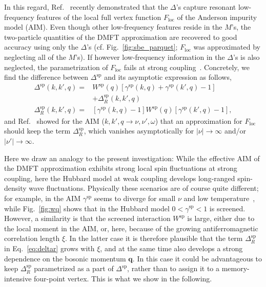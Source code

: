 \documentclass[epj]{svjour}
\newcommand{\qv}{\ensuremath{\mathbf{q}}}
\newcommand{\sz}{\ensuremath{\text{sp}}}
\begin{document}
In this regard, Ref.~\cite{Harkov21} recently demonstrated that the $\Delta$'s capture resonant
low-frequency features of the local full vertex function $F_\text{loc}$ of the Anderson impurity model (AIM).
Even though other low-frequency features reside in the $M$'s,
the two-particle quantities of the DMFT approximation are recovered to good accuracy using only the $\Delta$'s
(cf. Fig.~\ref{fig:sbe_parquet}; $F_\text{loc}$ was approximated by neglecting all of the $M$'s).
If however low-frequency information in the $\Delta$'s is also neglected,
the parametrization of $F_\text{loc}$ fails at strong coupling~\cite{Harkov21}.
Concretely, we find the difference between $\Delta^\sz$ and its asymptotic expression as follows,
\begin{align}
\Delta^\sz(k,k',q)=&W^\sz(q)\left[\gamma^\sz(k,q)+\gamma^\sz(k',q)-1\right]\nonumber\\
&+\Delta_R^\sz(k,k',q)\nonumber\\
\Delta_R^\sz(k,k',q)=&[\gamma^\sz(k,q)-1]W^\sz(q)[\gamma^\sz(k',q)-1]\label{eq:deltar},
\end{align}
and Ref.~\cite{Harkov21} showed for the AIM ($k,k',q\rightarrow\nu,\nu',\omega$)
that an approximation for $F_\text{loc}$ should keep the term $\Delta^\sz_R$,
which vanishes asymptotically for $|\nu|\rightarrow\infty$ and/or $|\nu'|\rightarrow\infty$.

Here we draw an analogy to the present investigation:
While the effective AIM of the DMFT approximation exhibits strong local spin fluctuations at strong coupling,
here the Hubbard model at weak coupling develops long-ranged spin-density wave fluctuations.
Physically these scenarios are of course quite different;
for example, in the AIM $\gamma^\sz$ seems to diverge for small $\nu$ and low temperature~\cite{Harkov21},
while Fig.~\ref{fig:wq} shows that in the Hubbard model $0<\gamma^\sz<1$ is screened.
However, a similarity is that the screened interaction $W^\sz$ is large, either due to the local moment in the AIM, or, here, {because of the growing antiferromagnetic correlation length $\xi$.}
In the latter case it is therefore plausible that the term $\Delta_R^\sz$ in
Eq.~\eqref{eq:deltar} grows with $\xi$,
and at the same time also develops a strong dependence on the bosonic momentum $\qv$.
In this case it could be advantageous to keep $\Delta_R^\sz$ parametrized as a part of $\Delta^\sz$,
rather than to assign it to a memory-intensive four-point vertex.
This is what we show in the following.
\end{document}
